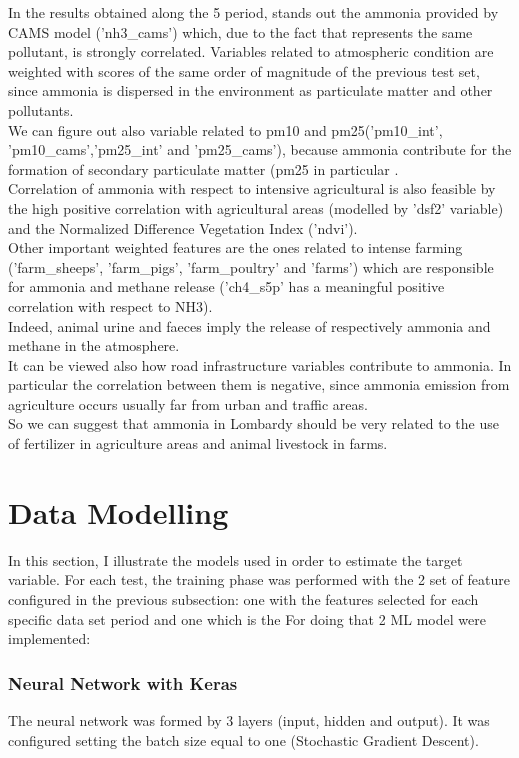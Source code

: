 In the results obtained along the 5 period, stands out the ammonia provided by CAMS model ('nh3\_cams') which, due to the fact that represents the same pollutant, is strongly correlated. Variables related to atmospheric condition are weighted with scores of the same order of magnitude of the previous test set, since ammonia is dispersed in the environment as particulate matter and other pollutants.\\
We can figure out also variable related to pm10 and pm25('pm10\_int', 'pm10\_cams','pm25\_int' and 'pm25\_cams'), because ammonia contribute for the formation of secondary particulate matter (pm25 in particular\cite{zhu2015sources} .\\
Correlation of ammonia with respect to intensive agricultural is also feasible by the high positive correlation with agricultural areas (modelled by 'dsf2' variable) and the Normalized Difference Vegetation Index ('ndvi').\\
Other important weighted features are the ones related to intense farming ('farm\_sheeps', 'farm\_pigs', 'farm\_poultry' and 'farms') which are responsible for ammonia and methane release ('ch4\_s5p' has a meaningful positive correlation with respect to NH3).\\
Indeed, animal urine and faeces imply the release of respectively ammonia and methane in the atmosphere\cite{saggar2004review}.\\
It can be viewed also how road infrastructure variables contribute to ammonia. In particular the correlation between them is negative, since ammonia emission from agriculture occurs usually far from urban and traffic areas.\\
So we can suggest that ammonia in Lombardy should be very related to the use of fertilizer in agriculture areas and animal livestock in farms.
 

\section{Data Modelling}
In this section, I illustrate the models used in order to estimate the target variable. For each test, the training phase was performed with the 2 set of feature configured in the previous subsection: one with the features selected for each specific data set period and one which is the
For doing that 2 ML model were implemented:

\subsubsection{Neural Network with Keras}
The neural network was formed by 3 layers (input, hidden and output). It was configured setting the batch size equal to one (Stochastic Gradient Descent).

